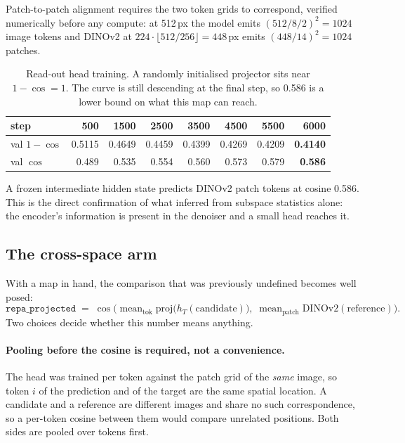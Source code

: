 \documentclass[10pt]{article}
\newcommand{\obs}[1]{\textcolor{observedblue}{#1}}
\begin{document}
Patch-to-patch alignment requires the two token grids to correspond, verified numerically before any
compute: at 512\,px the model emits $(512/8/2)^2 = 1024$ image tokens and DINOv2 at
$224\cdot\lfloor 512/256\rfloor = 448$\,px emits $(448/14)^2 = 1024$ patches.

\begin{table}[h]
\centering
\caption{Read-out head training. A randomly initialised projector sits near $1-\cos = 1$.
The curve is still descending at the final step, so \obs{0.586} is a lower bound on what this map
can reach.}
\label{tab:projector}
\small
\begin{tabular}{@{}lrrrrrrr@{}}
\toprule
step & 500 & 1500 & 2500 & 3500 & 4500 & 5500 & \textbf{6000} \\
\midrule
val $1-\cos$ & \obs{0.5115} & \obs{0.4649} & \obs{0.4459} & \obs{0.4399} & \obs{0.4269} & \obs{0.4209} & \obs{\textbf{0.4140}} \\
val $\cos$   & \obs{0.489} & \obs{0.535} & \obs{0.554} & \obs{0.560} & \obs{0.573} & \obs{0.579} & \obs{\textbf{0.586}} \\
\bottomrule
\end{tabular}
\end{table}

A frozen intermediate hidden state predicts DINOv2 patch tokens at cosine \obs{0.586}. This is the
direct confirmation of what  inferred from subspace statistics alone: the
encoder's information is present in the denoiser and a small head reaches it.

\subsection{The cross-space arm}

With a map in hand, the comparison that was previously undefined becomes well posed:
\[
  \texttt{repa\_projected} \;=\; \cos\!\Big(\operatorname{mean}_\text{tok} \text{proj}\big(h_T(\text{candidate})\big),\;
  \operatorname{mean}_\text{patch} \text{DINOv2}(\text{reference})\Big).
\]
Two choices decide whether this number means anything.

\paragraph{Pooling before the cosine is required, not a convenience.}
The head was trained per token against the patch grid of the \emph{same} image, so token $i$ of the
prediction and of the target are the same spatial location. A candidate and a reference are
different images and share no such correspondence, so a per-token cosine between them would compare
unrelated positions. Both sides are pooled over tokens first.
\end{document}
